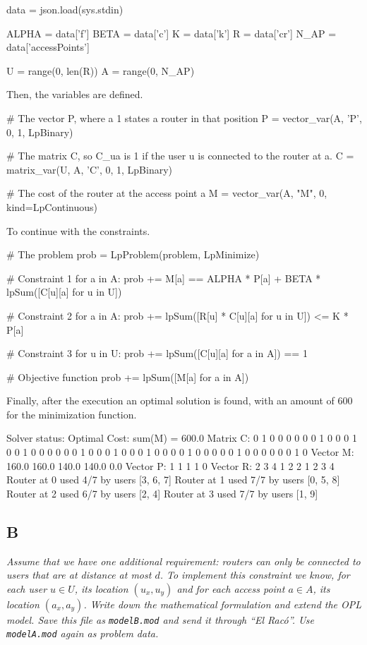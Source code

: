 \documentclass[11pt,a4paper]{article}
\begin{document}
\begin{pycode}
data = json.load(sys.stdin)

ALPHA = data['f']
BETA = data['c']
K = data['k']
R = data['cr']
N_AP = data['accessPoints']

U = range(0, len(R))
A = range(0, N_AP)
\end{pycode}
%
Then, the variables are defined.
%
\begin{pycode}
# The vector P, where a 1 states a router in that position
P = vector_var(A, 'P', 0, 1, LpBinary)

# The matrix C, so C_ua is 1 if the user u is connected to the router at a.
C = matrix_var(U, A, 'C', 0, 1, LpBinary)

# The cost of the router at the access point a
M = vector_var(A, "M", 0, kind=LpContinuous)
\end{pycode}
%
To continue with the constraints.
%
\begin{pycode}
# The problem
prob = LpProblem(problem, LpMinimize)

# Constraint 1
for a in A:
	prob += M[a] == ALPHA * P[a] + BETA * lpSum([C[u][a] for u in U])

# Constraint 2
for a in A:
	prob += lpSum([R[u] * C[u][a] for u in U]) <= K * P[a]

# Constraint 3
for u in U:
	prob += lpSum([C[u][a] for a in A]) == 1

# Objective function
prob += lpSum([M[a] for a in A])
\end{pycode}
%
Finally, after the execution an optimal solution is found, with an amount of 600 
for the minimization function.
%
\begin{textcode}
Solver status: Optimal
Cost: sum(M) = 600.0
Matrix C:
  0  1  0  0  0
  0  0  0  1  0
  0  0  1  0  0
  1  0  0  0  0
  0  0  1  0  0
  0  1  0  0  0
  1  0  0  0  0
  1  0  0  0  0
  0  1  0  0  0
  0  0  0  1  0
Vector M:
  160.0  160.0  140.0  140.0  0.0
Vector P:
  1  1  1  1  0
Vector R:
  2  3  4  1  2  2  1  2  3  4
Router at 0 used 4/7 by users [3, 6, 7]
Router at 1 used 7/7 by users [0, 5, 8]
Router at 2 used 6/7 by users [2, 4]
Router at 3 used 7/7 by users [1, 9]
\end{textcode}

\subsection*{B}
\textsl{Assume that we have one additional requirement: routers can only be 
connected to users that are at distance at most $d$. To implement this 
constraint we know, for each user $u \in U$, its location $(u_x, u_y)$ and for 
each access point $a \in A$, its location $(a_x, a_y)$. Write down the 
mathematical formulation and extend the OPL model. Save this file as 
\texttt{modelB.mod} and send it through ``El Racó''. Use \texttt{modelA.mod} 
again as problem data.}
\end{document}
